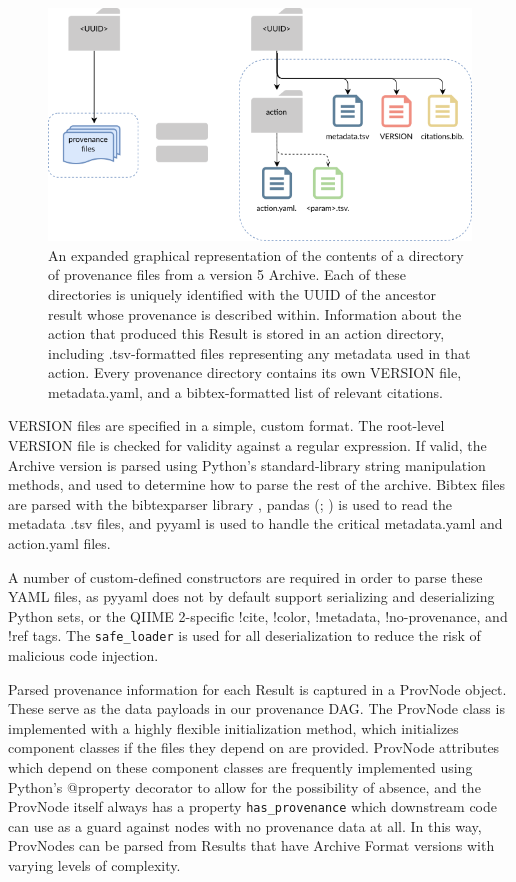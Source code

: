 \begin{figure}[htp]
\centering
\includegraphics[width=\textwidth]{figures/prov_files.png}
\caption[Diagram of the provenance file directories in a QIIME 2 Archive]%
{An expanded graphical representation of the contents of a directory of
provenance files from a version 5 Archive. Each of these directories is uniquely
identified with the UUID of the ancestor result whose provenance is described
within. Information about the action that produced this Result is stored in an
action directory, including .tsv-formatted files representing any metadata used
in that action. Every provenance directory contains its own VERSION file,
metadata.yaml, and a bibtex-formatted list of relevant citations.}
\label{fig:provenance_files}
\end{figure}
VERSION files are specified in a simple, custom format. The root-level VERSION
file is checked for validity against a regular expression. If valid, the Archive
version is parsed using Python’s standard-library string manipulation methods,
and used to determine how to parse the rest of the archive. Bibtex files are
parsed with the bibtexparser library \parencite{boulogne_bibtexparser_nodate},
pandas (\cite{reback_pandas-devpandas_2020}; \cite{mckinney_data_2010}) is used to read the
metadata .tsv files, and pyyaml is used to handle the critical metadata.yaml and
action.yaml files.

A number of custom-defined constructors are required in order to parse these
YAML files, as pyyaml does not by default support serializing and deserializing
Python sets, or the QIIME 2-specific !cite, !color, !metadata, !no-provenance,
and !ref tags. The \texttt{safe\_loader} is used for all deserialization to reduce the
risk of malicious code injection.

Parsed provenance information for each Result is captured in a ProvNode object.
These serve as the data payloads in our provenance DAG. The ProvNode class is
implemented with a highly flexible initialization method, which initializes
component classes if the files they depend on are provided. ProvNode attributes
which depend on these component classes are frequently implemented using
Python’s @property decorator to allow for the possibility of absence, and the
ProvNode itself always has a property \texttt{has\_provenance} which downstream code can
use as a guard against nodes with no provenance data at all. In this way,
ProvNodes can be parsed from Results that have Archive Format versions with
varying levels of complexity. 

